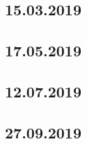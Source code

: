 \documentclass[a4paper,12p]{article}
\begin{document}
	\subsection{15.03.2019}
		
	
%	
%	
	\newpage	
	\subsection{17.05.2019}
	
	
	\newpage
	\subsection{12.07.2019}
	
	
	
	
	\newpage
	\subsection{27.09.2019}
\end{document}
